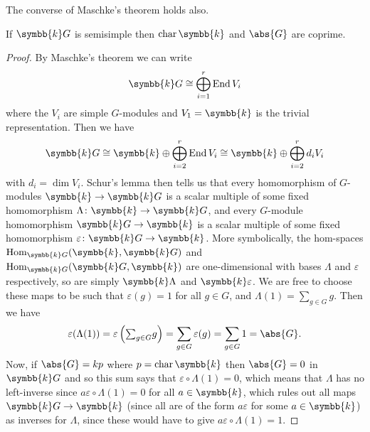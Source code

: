 \documentclass[fleqn]{NotesClass}
\renewcommand{\field}{\symbb{k}}
\DeclareMathOperator{\End}{End}
\DeclareMathOperator{\Hom}{Hom}
\newcommand{\isomorphic}{\cong}
\DeclareMathOperator{\Char}{char}
\begin{document}
    The converse of Maschke's theorem holds also.
    
    \begin{prp}{}{}
        If \(\field G\) is semisimple then \(\Char \field\) and \(\abs{G}\) are coprime.
        \begin{proof}
            By Maschke's theorem we can write
            \begin{equation}
                \field G \isomorphic \bigoplus_{i=1}^r \End V_i
            \end{equation}
            where the \(V_i\) are simple \(G\)-modules and \(V_1 = \field\) is the trivial representation.
            Then we have
            \begin{equation}
                \field G \isomorphic \field \oplus \bigoplus_{i=2}^r \End V_i \isomorphic \field \oplus \bigoplus_{i=2}^r d_i V_i
            \end{equation}
            with \(d_i = \dim V_i\).
            Schur's lemma then tells us that every homomorphism of \(G\)-modules \(\field \to \field G\) is a scalar multiple of some fixed homomorphism \(\Lambda \colon \field \to \field G\), and every \(G\)-module homomorphism \(\field G \to \field\) is a scalar multiple of some fixed homomorphism \(\varepsilon \colon \field G \to \field\).
            More symbolically, the hom-spaces \(\Hom_{\field G}(\field, \field G)\) and \(\Hom_{\field G}(\field G, \field)\) are one-dimensional with bases \(\Lambda\) and \(\varepsilon\) respectively, so are simply \(\field \Lambda\) and \(\field \varepsilon\).
            We are free to choose these maps to be such that \(\varepsilon(g) = 1\) for all \(g \in G\), and \(\Lambda(1) = \sum_{g \in G} g\).
            Then we have
            \begin{equation}
                \varepsilon(\Lambda(1)) = \varepsilon\left( {\textstyle \sum_{g \in G}} g \right) = \sum_{g \in G} \varepsilon(g) = \sum_{g \in G} 1 = \abs{G}.
            \end{equation}
            Now, if \(\abs{G} = kp\) where \(p = \Char \field\) then \(\abs{G} = 0\) in \(\field G\) and so this sum says that \(\varepsilon \circ \Lambda(1) = 0\), which means that \(\Lambda\) has no left-inverse since \(a \varepsilon \circ \Lambda(1) = 0\) for all \(a \in \field\), which rules out all maps \(\field G \to \field\) (since all are of the form \(a\varepsilon\) for some \(a \in \field\)) as inverses for \(\Lambda\), since these would have to give \(a \varepsilon \circ \Lambda(1) = 1\).
        \end{proof}
    \end{prp}
    
\end{document}
